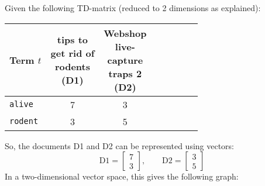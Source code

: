 				Given the following TD-matrix (reduced to 2 dimensions as explained):
				\begin{table}[H]
					\centering
					\begin{tabular}{|l|c|c|c|c|c|c|c|}
						\hline
						\textbf{Term} \(t\) & \makecell{tips to \\ get rid of \\ rodents \\ (D1)} & \makecell{Webshop \\ live- \\ capture \\ traps 2 \\ (D2)} \\ \hline
						\texttt{alive}      & 7                                                   & 3                                                         \\ \hline
						\texttt{rodent}     & 3                                                   & 5                                                         \\ \hline
					\end{tabular}
				\end{table}
				So, the documents D1 and D2 can be represented using vectors:
				\begin{equation*}
					\text{D1} =
					\begin{bmatrix}
						7 \\
						3
					\end{bmatrix},
					\quad\quad
					\text{D2} =
					\begin{bmatrix}
						3 \\
						5
					\end{bmatrix}
				\end{equation*}
				In a two-dimensional vector space, this gives the following graph:
				\begin{figure}[H]
					\centering
				\end{figure}

